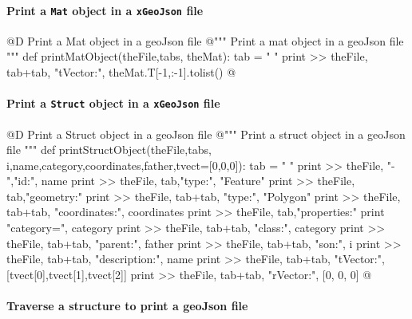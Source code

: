 \documentclass[11pt,oneside]{article}	%
\begin{document}
\paragraph{Print a \texttt{Mat} object in a \texttt{xGeoJson} file}

@D Print a Mat object in a geoJson file
@{""" Print a mat object in a geoJson file """
def printMatObject(theFile,tabs, theMat):
    tab = "    "
    print >> theFile, tab+tab, "tVector:", theMat.T[-1,:-1].tolist()
@}

\paragraph{Print a \texttt{Struct} object in a \texttt{xGeoJson} file}

@D Print a Struct object in a geoJson file
@{""" Print a struct object in a geoJson file """
def printStructObject(theFile,tabs, i,name,category,coordinates,father,tvect=[0,0,0]):
    tab = "    "
    print >> theFile, "-   ","id:", name
    print >> theFile, tab,"type:", "Feature"
    print >> theFile, tab,"geometry:" 
    print >> theFile, tab+tab, "type:", "Polygon"
    print >> theFile, tab+tab, "coordinates:", coordinates
    print >> theFile, tab,"properties:"
    print "category=", category
    print >> theFile, tab+tab, "class:", category
    print >> theFile, tab+tab, "parent:", father
    print >> theFile, tab+tab, "son:", i
    print >> theFile, tab+tab, "description:", name
    print >> theFile, tab+tab, "tVector:", [tvect[0],tvect[1],tvect[2]]
    print >> theFile, tab+tab, "rVector:", [0, 0, 0]
@}



\paragraph{Traverse a structure to print a geoJson file}
\end{document}
